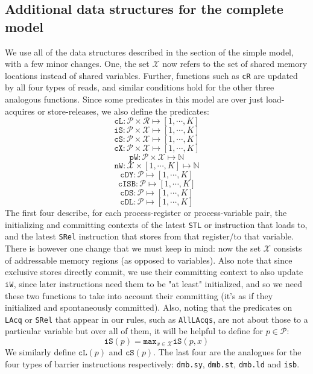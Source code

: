 \documentclass{article}
\newcommand{\var}{\texttt}
\begin{document}
\subsection{Additional data structures for the complete model}
We use all of the data structures described in the section of the simple model, with a few minor changes. One, the set $\mathcal{X}$ now refers to the set of shared memory locations instead of shared variables. Further, functions such as \var{cR} are updated by all four types of reads, and similar conditions hold for the other three analogous functions. Since some predicates in this model are over just load-acquires or store-releases, we also define the predicates: 
$$ \var{cL}: \mathcal{P} \times \mathcal{R} \mapsto [1,\cdots,K] $$
$$ \var{iS}: \mathcal{P} \times \mathcal{X} \mapsto [1,\cdots,K] $$
$$ \var{cS}: \mathcal{P} \times \mathcal{X} \mapsto [1,\cdots,K] $$
$$ \var{cX}: \mathcal{P} \times \mathcal{X} \mapsto [1,\cdots,K] $$
$$ \var{pW}: \mathcal{P} \times \mathcal{X} \mapsto \mathbb{N} $$
$$ \var{nW}: \mathcal{X} \times [1,\cdots,K] \mapsto \mathbb{N} $$
$$ \var{cDY}: \mathcal{P} \mapsto [1,\cdots,K] $$
$$ \var{cISB}: \mathcal{P} \mapsto [1,\cdots,K] $$
$$ \var{cDS}: \mathcal{P} \mapsto [1,\cdots,K] $$
$$ \var{cDL}: \mathcal{P} \mapsto [1,\cdots,K] $$
The first four describe, for each process-register or process-variable pair, the initializing and committing contexts of the latest \var{STL} or instruction that loads to, and the latest \var{SRel} instruction that stores from that register/to that variable. There is however one change that we must keep in mind: now the set $\mathcal{X}$ consists of addressable memory regions (as opposed to variables). Also note that since exclusive stores directly commit, we use their committing context to also update $\var{iW}$, since later instructions need them to be "at least" initialized, and so we need these two functions to take into account their committing (it's as if they initialized and spontaneously committed). Also, noting that the predicates on \var{LAcq} or \var{SRel} that appear in our rules, such as \var{AllLAcqs}, are not about those to a particular variable but over all of them, it will be helpful to define for $p \in \mathcal{P}$:
$$ \var{iS}(p) = \var{max}_{x \in \mathcal{X}} \var{iS}(p,x)$$
We similarly define $\var{cL}(p)$ and $\var{cS}(p)$. The last four are the analogues for the four types of barrier instructions respectively: \var{dmb.sy}, \var{dmb.st}, \var{dmb.ld} and \var{isb}.\\
\end{document}
